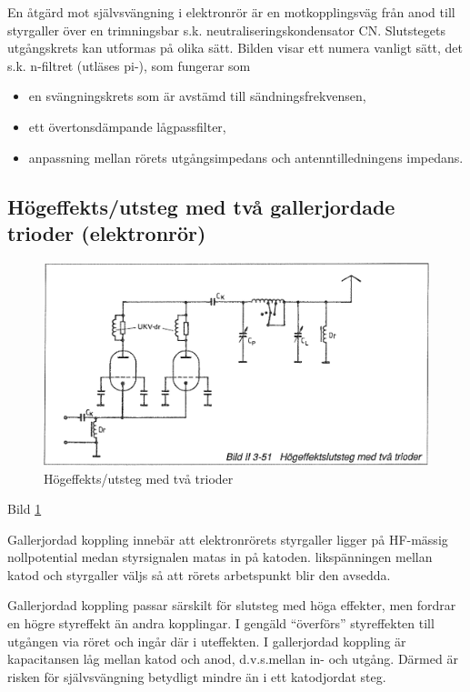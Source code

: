 En åtgärd mot självsvängning i elektronrör är en motkopplingsväg från
anod till styrgaller över en trimningsbar
s.k. neutraliseringskondensator CN. Slutstegets utgångskrets kan
utformas på olika sätt. Bilden visar ett numera vanligt sätt, det
s.k. n-filtret (utläses pi-), som fungerar som
\begin{itemize}
\item en svängningskrets som är avstämd till sändningsfrekvensen,
\item ett övertonsdämpande lågpassfilter,
\item anpassning mellan rörets utgångsimpedans och antenntilledningens impedans.
\end{itemize}

\subsection{Högeffekts/utsteg med två gallerjordade trioder (elektronrör)}

\begin{figure}[h]
\begin{center}
\includegraphics[width=14cm]{images/bild_2_3-51}
\caption{Högeffekts/utsteg med två trioder}
\label{fig:BildII3-51}
\end{center}
\end{figure}

Bild \ref{fig:BildII3-51}

Gallerjordad koppling innebär att elektronrörets styrgaller ligger på
HF-mässig nollpotential medan styrsignalen matas in på
katoden. likspänningen mellan katod och styrgaller väljs så att rörets
arbetspunkt blir den avsedda.

Gallerjordad koppling passar särskilt för slutsteg med höga effekter,
men fordrar en högre styreffekt än andra kopplingar. I gengäld
``överförs'' styreffekten till utgången via röret och ingår där i
uteffekten. I gallerjordad koppling är kapacitansen låg mellan katod
och anod, d.v.s.mellan in- och utgång. Därmed är risken för
självsvängning betydligt mindre än i ett katodjordat steg.

